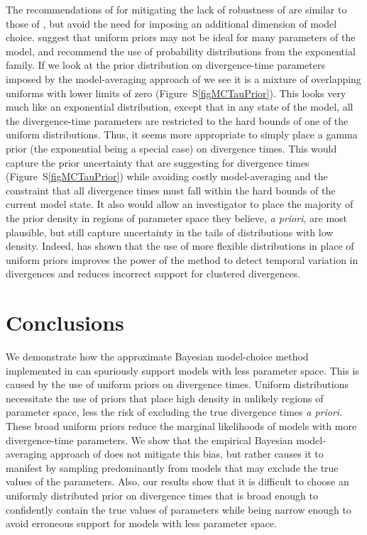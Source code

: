 The recommendations of \citet{Oaks2012} for mitigating the lack of robustness
of \msb are similar to those of \citet{Hickerson2013}, but avoid the
need for imposing an additional dimension of model choice.
\citet{Oaks2012} suggest that uniform priors may not be ideal for many
parameters of the \msb model, and recommend the use of probability
distributions from the exponential family.
If we look at the prior distribution on divergence-time parameters imposed by
the model-averaging approach of \citet{Hickerson2013} we see it is a mixture of
overlapping uniforms with lower limits of zero (Figure~S\ref{figMCTauPrior}).
This looks very much like an exponential distribution, except that in any state
of the model, all the divergence-time parameters are restricted to the hard
bounds of one of the uniform distributions.
Thus, it seems more appropriate to simply place a gamma prior (the exponential
being a special case) on divergence times.
This would capture the prior uncertainty that \citet{Hickerson2013} are
suggesting for divergence times (Figure~S\ref{figMCTauPrior}) while avoiding
costly model-averaging and the constraint that all divergence times must fall
within the hard bounds of the current model state.
It also would allow an investigator to place the majority of the prior density
in regions of parameter space they believe, \emph{a priori}, are most
plausible, but still capture uncertainty in the tails of distributions with low
density.
Indeed, \citet{Oaks2014dpp} has shown that the use of more flexible
distributions in place of uniform priors improves the power of the method to
detect temporal variation in divergences and reduces incorrect support for
clustered divergences.



\section{Conclusions}
We demonstrate how the approximate Bayesian model-choice method implemented in
\msb can spuriously support models with less parameter space.
This is caused by the use of uniform priors on divergence times.
Uniform distributions necessitate the use of priors that place high density in
unlikely regions of parameter space, less the risk of excluding the true
divergence times \emph{a priori}.
These broad uniform priors reduce the marginal likelihoods of models with more
divergence-time parameters.
We show that the empirical Bayesian model-averaging approach of
\citet{Hickerson2013} does not mitigate this bias, but rather causes it to
manifest by sampling predominantly from models that may exclude the true values
of the parameters.
Also, our results show that it is difficult to choose an uniformly distributed
prior on divergence times that is broad enough to confidently contain the true
values of parameters while being narrow enough to avoid erroneous support for
models with less parameter space.

